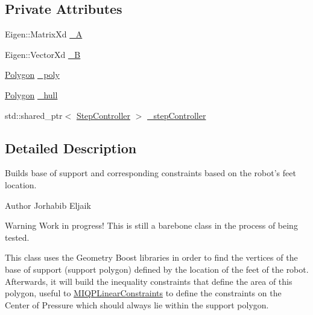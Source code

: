 \subsection*{\-Private \-Attributes}
\begin{DoxyCompactItemize}
\item 
\-Eigen\-::\-Matrix\-Xd \hyperlink{classBaseOfSupport_a54a35d087a8dfaee9a27d025d46f706d}{\-\_\-\-A}
\item 
\-Eigen\-::\-Vector\-Xd \hyperlink{classBaseOfSupport_adfa70199064a50d9d7aea9a6d4b13246}{\-\_\-\-B}
\item 
\hyperlink{BaseOfSupport_8h_a3b0bf53b9d321e300a59729ebe10e02c}{\-Polygon} \hyperlink{classBaseOfSupport_a7e9b4ef515f90e2a7012871e7287bf5e}{\-\_\-poly}
\item 
\hyperlink{BaseOfSupport_8h_a3b0bf53b9d321e300a59729ebe10e02c}{\-Polygon} \hyperlink{classBaseOfSupport_a3caa9bcea814865f12d891c0a1c8c4ea}{\-\_\-hull}
\item 
std\-::shared\-\_\-ptr$<$ \hyperlink{classStepController}{\-Step\-Controller} $>$ \hyperlink{classBaseOfSupport_a023d28c6900f0e97d9de42ca2c5d94a5}{\-\_\-step\-Controller}
\end{DoxyCompactItemize}


\subsection{\-Detailed \-Description}
\-Builds base of support and corresponding constraints based on the robot's feet location. 

\begin{DoxyAuthor}{\-Author}
\-Jorhabib \-Eljaik \cite{ibanezThesis2015} 
\end{DoxyAuthor}
\begin{DoxyWarning}{\-Warning}
\-Work in progress! \-This is still a barebone class in the process of being tested.
\end{DoxyWarning}
\-This class uses the \-Geometry \-Boost libraries in order to find the vertices of the base of support (support polygon) defined by the location of the feet of the robot. \-Afterwards, it will build the inequality constraints that define the area of this polygon, useful to \hyperlink{classMIQPLinearConstraints}{\-M\-I\-Q\-P\-Linear\-Constraints} to define the constraints on the \-Center of \-Pressure which should always lie within the support polygon. 

